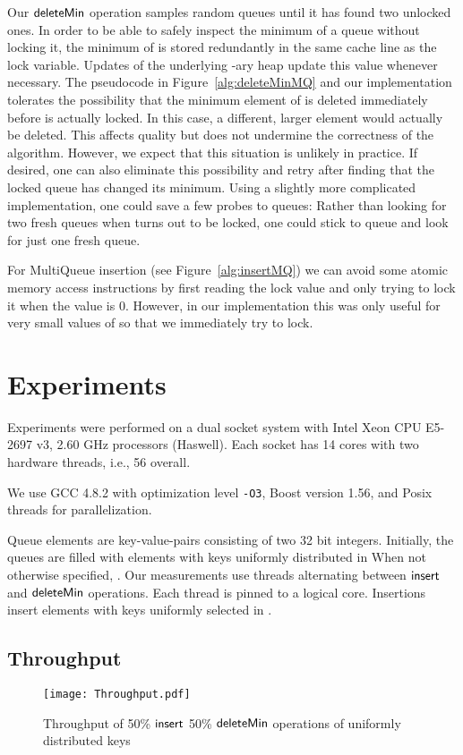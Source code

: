 \documentclass[a4paper,12pt]{article}
\newcommand{\Id}[1]{\ensuremath{\text{{\sf #1}}}}
\begin{document}
Our \Id{deleteMin} operation samples random queues until it has found two unlocked ones. In order to be able to safely inspect the minimum of a queue without locking it, the minimum of  is stored redundantly in the same cache line as the lock variable. Updates of the underlying -ary heap update this value whenever necessary. The pseudocode in Figure~\ref{alg:deleteMinMQ} and our implementation tolerates the possibility that the minimum element of  is deleted immediately before  is actually locked. In this case, a different, larger element would actually be deleted. This affects quality but does not undermine the correctness of the algorithm. However, we expect that this situation is unlikely in practice. If desired, one can also eliminate this possibility and retry after finding that the locked queue has changed its minimum.  Using a slightly more complicated implementation, one could save a few probes to queues: Rather than looking for two fresh queues when  turns out to be locked, one could stick to queue  and look for just one fresh queue.

For MultiQueue insertion (see Figure~\ref{alg:insertMQ}) we can avoid some atomic memory access instructions by first reading the lock value and only trying to lock it when the value is 0. However, in our implementation this was only useful for very small values of  so that we immediately try to lock.


\section{Experiments}
\label{s:experiments}

Experiments were performed on a dual socket system with Intel\textsuperscript{\textregistered} Xeon\textsuperscript{\textregistered} CPU E5-2697 v3, 2.60 GHz processors (Haswell). Each socket has 14 cores with two hardware threads, i.e., 56 overall.

We use GCC 4.8.2 with optimization level {\tt -O3}, Boost version 1.56, and Posix threads for parallelization. 

Queue elements are key-value-pairs consisting of two 32 bit integers. 
Initially, the queues are filled with  elements with keys uniformly distributed in  When not otherwise specified, .
Our measurements use threads alternating between \Id{insert} and \Id{deleteMin} operations. Each thread is pinned to a logical core.
Insertions insert elements with keys uniformly selected in .

\subsection{Throughput}
\begin{figure}
\centering\texttt{[image: Throughput.pdf]}
\caption{Throughput of 50\% \Id{insert} 50\% \Id{deleteMin} operations of uniformly distributed keys} 
\label{fig:throughput}
\end{figure}
\end{document}
